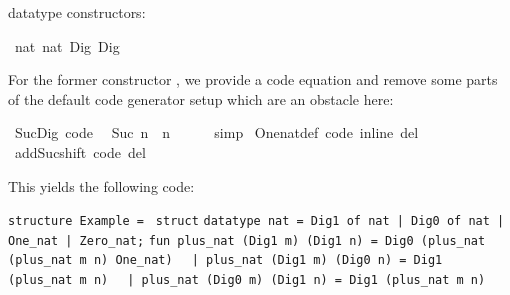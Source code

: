 \begin{isabellebody}
\begin{isamarkuptext}
  datatype constructors:%
\end{isamarkuptext}%
\isamarkuptrue%
%
\isadelimquote
%
\endisadelimquote
%
\isatagquote
{}\isamarkupfalse%
\ {\isachardoublequoteopen}{}{\isasymColon}nat{\isachardoublequoteclose}\ {\isachardoublequoteopen}{}{\isasymColon}nat{\isachardoublequoteclose}\ Dig{}\ Dig{}%
\endisatagquote
{\isafoldquote}%
%
\isadelimquote
%
\endisadelimquote
%
\begin{isamarkuptext}%
\noindent For the former constructor , we provide a code
  equation and remove some parts of the default code generator setup
  which are an obstacle here:%
\end{isamarkuptext}%
\isamarkuptrue%
%
\isadelimquote
%
\endisadelimquote
%
\isatagquote
{}\isamarkupfalse%
\ Suc{\isacharunderscore}Dig\ {\isacharbrackleft}code{\isacharbrackright}{\isacharcolon}\isanewline
\ \ {\isachardoublequoteopen}Suc\ n\ {\isacharequal}\ n\ {\isacharplus}\ {}{\isachardoublequoteclose}\isanewline
\ \ \isamarkupfalse%
\ simp\isanewline
\isanewline
{}\isamarkupfalse%
\ One{\isacharunderscore}nat{\isacharunderscore}def\ {\isacharbrackleft}code\ inline\ del{\isacharbrackright}\isanewline
{}\isamarkupfalse%
\ add{\isacharunderscore}Suc{\isacharunderscore}shift\ {\isacharbrackleft}code\ del{\isacharbrackright}%
\endisatagquote
{\isafoldquote}%
%
\isadelimquote
%
\endisadelimquote
%
\begin{isamarkuptext}%
\noindent This yields the following code:%
\end{isamarkuptext}%
\isamarkuptrue%
%
\isadelimquote
%
\endisadelimquote
%
\isatagquote
%
\begin{isamarkuptext}%
\isaverbatim%
\noindent%
\verb|structure Example = |\newline%
\verb|struct|\newline%
\newline%
\verb|datatype nat = Dig1 of nat |\verb,|,\verb| Dig0 of nat |\verb,|,\verb| One_nat |\verb,|,\verb| Zero_nat;|\newline%
\newline%
\verb|fun plus_nat (Dig1 m) (Dig1 n) = Dig0 (plus_nat (plus_nat m n) One_nat)|\newline%
\verb|  |\verb,|,\verb| plus_nat (Dig1 m) (Dig0 n) = Dig1 (plus_nat m n)|\newline%
\verb|  |\verb,|,\verb| plus_nat (Dig0 m) (Dig1 n) = Dig1 (plus_nat m n)|\newline%

\end{isamarkuptext}
\end{isabellebody}
